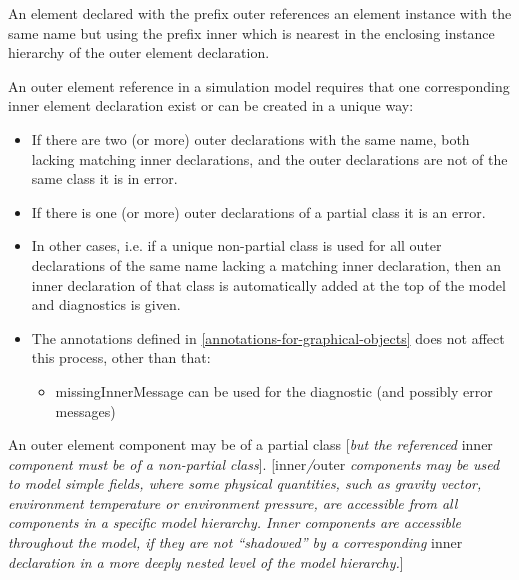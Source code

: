 \documentclass[10pt,a4paper]{report}
\begin{document}
An element declared with the prefix outer references an element instance
with the same name but using the prefix inner which is nearest in the
enclosing instance hierarchy of the outer element declaration.

An outer element reference in a simulation model requires that one
corresponding inner element declaration exist or can be created in a
unique way:

\begin{itemize}
\item
  If there are two (or more) outer declarations with the same name, both
  lacking matching inner declarations, and the outer declarations are
  not of the same class it is in error.
\item
  If there is one (or more) outer declarations of a partial class it is
  an error.
\item
  In other cases, i.e. if a unique non-partial class is used for all
  outer declarations of the same name lacking a matching inner
  declaration, then an inner declaration of that class is automatically
  added at the top of the model and diagnostics is given.
\item
  The annotations defined in \ref{annotations-for-graphical-objects} does not affect this process,
  other than that:

  \begin{itemize}
  \item
    missingInnerMessage can be used for the diagnostic (and possibly
    error messages)
  \end{itemize}
\end{itemize}

An outer element component may be of a partial class {[}\emph{but the
referenced} inner \emph{component must be of a non-partial class}{]}.
{[}inner\emph{/}outer \emph{components may be used to model simple
fields, where some physical quantities, such as gravity vector,
environment temperature or environment pressure, are accessible from all
components in a specific model hierarchy. Inner components are
accessible throughout the model, if they are not ``shadowed'' by a
corresponding} inner \emph{declaration in a more deeply nested level of
the model hierarchy.}{]}
\end{document}

